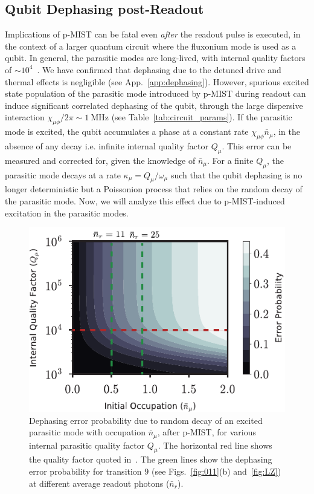 \documentclass[%
reprint,
superscriptaddress,
 amsmath,amssymb,
 aps,
 prx,
longbibliography,
floatfix,
]{revtex4-2}
\begin{document}
\subsection{Qubit Dephasing post-Readout} 
Implications of p-MIST can be fatal even \textit{after} the readout pulse is executed, in the context of a larger quantum circuit where the fluxonium mode is used as a qubit. In general, the parasitic modes are long-lived, with internal quality factors of $\sim 10^{4}$~\cite{masluk_microwave_2012, masluk2013reducing}. We have confirmed that dephasing due to the detuned drive and thermal effects is negligible (see App.~\ref{app:dephasing}). However, spurious excited state population of the parasitic mode introduced by p-MIST during readout can induce significant correlated dephasing of the qubit, through the large dispersive interaction $\chi_{\mu \phi}/2\pi \sim 1 \ \mathrm{MHz}$ (see Table~\ref{tab:circuit_params}). If the parasitic mode is excited, the qubit accumulates a phase at a constant rate $\chi_{\mu\phi} \bar n_\mu$, in the absence of any decay i.e. infinite internal quality factor $Q_\mu$. This error can be measured and corrected for, given the knowledge of $\bar n_\mu$. For a finite $Q_\mu$, the parasitic mode decays at a rate $\kappa_\mu=Q_\mu/\omega_\mu$ such that the qubit dephasing is no longer deterministic but a Poissonion process that relies on the random decay of the parasitic mode. Now, we will analyze this effect due to p-MIST-induced excitation in the parasitic modes.


\begin{figure}[htb]
    \centering
    \includegraphics[width=\linewidth]{Figures/dephasing.pdf}
    \caption{Dephasing error probability due to random decay of an excited parasitic mode with occupation $\bar n_\mu$, after p-MIST, for various internal parasitic quality factor $Q_\mu$. The horizontal red line shows the quality factor quoted in~\cite{masluk_microwave_2012}. The green lines show the dephasing error probability for transition $9$ (see Figs.~\ref{fig:011}(b) and~\ref{fig:LZ}) at different average readout photons ($\bar n_r$).}
    \label{fig:dephasing}
\end{figure}
\end{document}
